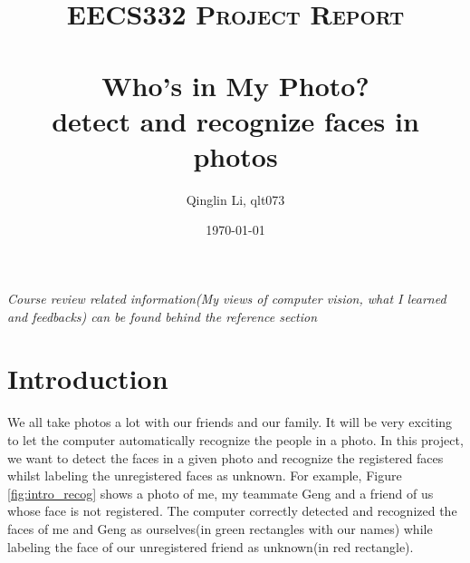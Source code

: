 \documentclass[paper=a4, fontsize=11pt]{scrartcl} %
\title{	
\normalfont \normalsize 
\textsc{EECS332 Project Report} \\ [25pt] %
\horrule{0.5pt} \\[0.4cm] %
\huge Who's in My Photo? \\ %
\normalsize detect and recognize faces in photos
\horrule{2pt} \\[0.5cm] %
}
\author{Qinglin Li, qlt073} %
\date{\normalsize\today} %
\numberwithin{equation}{section} %
\numberwithin{figure}{section} %
\numberwithin{table}{section} %
\begin{document}
\maketitle %

\textit{Course review related information(My views of computer vision, what I learned and feedbacks) can be found behind the reference section}

\section{Introduction}

We all take photos a lot with our friends and our family. It will be very exciting to let the computer automatically recognize the people in a photo. In this project, we want to detect the faces in a given photo and recognize the registered faces whilst labeling the unregistered faces as unknown. For example, Figure \ref{fig:intro_recog} shows a photo of me, my teammate Geng and a friend of us whose face is not registered. The computer correctly detected and recognized the faces of me and Geng as ourselves(in green rectangles with our names) while labeling the face of our unregistered friend as unknown(in red rectangle).
\newpage
\end{document}
